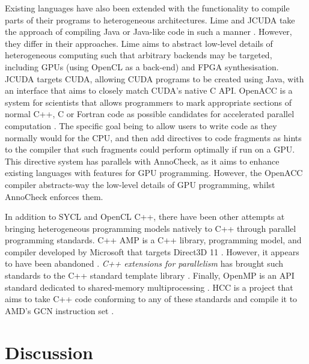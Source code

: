 \documentclass[a4paper,12pt,twoside,openright]{report}
\begin{document}
Existing languages have also been extended with the functionality to compile
parts of their programs to heterogeneous architectures. Lime and JCUDA take the
approach of compiling Java or Java-like code in such a manner \cite{Lime2010}
\cite{Lime2012} \cite{JCUDA2009}. However, they differ in their approaches.
Lime aims to abstract low-level details of heterogeneous computing such that
arbitrary backends may be targeted, including GPUs (using OpenCL as a back-end)
and FPGA synthesisation. JCUDA targets CUDA, allowing CUDA programs to be
created using Java, with an interface that aims to closely match CUDA's native
C API. OpenACC is a system for scientists that allows programmers to mark
appropriate sections of normal C++, C or Fortran code as possible candidates
for accelerated parallel computation \cite{OpenACC}. The specific goal being to
allow users to write code as they normally would for the CPU, and then add
directives to code fragments as hints to the compiler that such fragments could
perform optimally if run on a GPU. This directive system has parallels with
AnnoCheck, as it aims to enhance existing languages with features for GPU
programming. However, the OpenACC compiler abstracts-way the low-level details
of GPU programming, whilst AnnoCheck enforces them.

In addition to SYCL and OpenCL C++, there have been other attempts at bringing
heterogeneous programming models natively to C++ through parallel programming
standards. C++ AMP is a C++ library, programming model, and compiler developed
by Microsoft that targets Direct3D 11 \cite{CAMP}. However, it appears to have
been abandoned \cite{CAMPFail1} \cite{CAMPFail2}. \textit{C++ extensions for
parallelism} has brought such standards to the C++ standard template library
\cite{CPPParallelism}. Finally, OpenMP is an API standard dedicated to
shared-memory multiprocessing \cite{OpenMP}. HCC is a project that aims to take
C++ code conforming to any of these standards and compile it to AMD's GCN
instruction set \cite{HCC}.

\section{Discussion}
\end{document}
